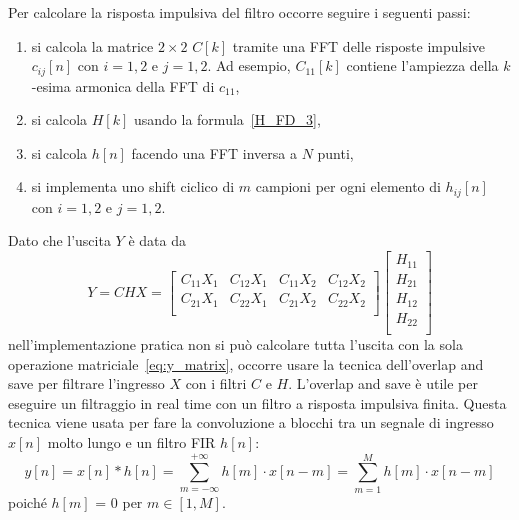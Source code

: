 \documentclass[12pt,a4paper,titlepage]{article}
\begin{document}
Per calcolare la risposta impulsiva del filtro occorre seguire i seguenti passi:
\begin{enumerate}
\item si calcola la matrice $2 \times 2$ $C[k]$ tramite una FFT delle risposte impulsive $c_{ij}[n]$ con $i = 1, 2$ e $j = 1, 2$. Ad esempio, $C_{11}[k]$ contiene l'ampiezza della $k$-esima armonica della FFT di $c_{11}$,
\item si calcola $H[k]$ usando la formula~\eqref{H_FD_3},
\item si calcola $h[n]$ facendo una FFT inversa a $N$ punti,
\item si implementa uno shift ciclico di $m$ campioni per ogni elemento di $h_{ij}[n]$ con $i = 1, 2$ e $j = 1, 2$.
\end{enumerate}

Dato che l'uscita $Y$ è data da
\begin{equation}\label{eq:y_matrix}
Y = CHX = 
\begin{bmatrix}
C_{11} X_1 & C_{12} X_1 & C_{11} X_2 & C_{12} X_2 \\ 
C_{21} X_1 & C_{22} X_1 & C_{21} X_2 & C_{22} X_2 \\ 
\end{bmatrix}
\begin{bmatrix}
H_{11}\\
H_{21}\\
H_{12}\\
H_{22}\\
\end{bmatrix}
\end{equation}
nell'implementazione pratica non si può calcolare tutta l'uscita con la sola operazione matriciale~\eqref{eq:y_matrix}, occorre usare la tecnica dell'overlap and save per filtrare l'ingresso $X$ con i filtri $C$ e $H$. L'overlap and save è utile per eseguire un filtraggio in real time con un filtro a risposta impulsiva finita. Questa tecnica viene usata per fare la convoluzione a blocchi tra un segnale di ingresso $x[n]$ molto lungo e un filtro FIR $h[n]$:
\begin{equation}
y[n] = x[n] * h[n] = \sum_{m=-\infty}^{+\infty} {h[m] \cdot x[n-m]} = \sum_{m=1}^{M} {h[m] \cdot x[n-m]}
\end{equation}
poiché $h[m]$ = 0 per $m \in [1, M]$.
\end{document}
